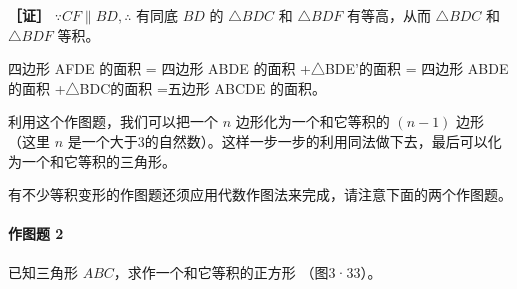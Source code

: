 \textbf{［证］} \(\because CF \parallel BD, \therefore\) 有同底 \(BD\)
的 \(\triangle BDC\) 和 \(\triangle BDF\) 有等高，从而 \(\triangle BDC\)
和 \(\triangle BDF\) 等积。

四边形 AFDE 的面积 = 四边形 ABDE 的面积 +△BDE'的面积 = 四边形 ABDE
的面积 +△BDC的面积 =五边形 ABCDE 的面积。

利用这个作图题，我们可以把一个 \(n\) 边形化为一个和它等积的 \((n - 1)\)
边形（这里 \(n\)
是一个大于3的自然数）。这样一步一步的利用同法做下去，最后可以化为一个和它等积的三角形。

有不少等积变形的作图题还须应用代数作图法来完成，请注意下面的两个作图题。

\paragraph{作图题 2}

已知三角形 \(ABC\)，求作一个和它等积的正方形 （图3·33）。

